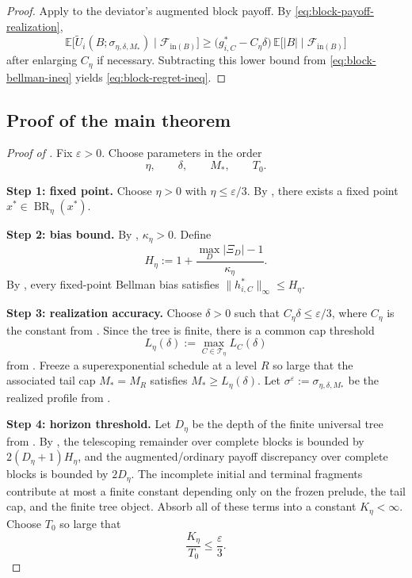 \documentclass[12pt]{article}
\theoremstyle{definition}
\newcommand{\eps}{\varepsilon}
\newcommand{\E}{\mathbb{E}}
\newcommand{\1}{\mathbf{1}}
\newcommand{\cF}{\mathcal{F}}
\newcommand{\cT}{\mathcal{T}}
\DeclareMathOperator{\BR}{BR}
\begin{document}
\begin{proof}
Apply  to the deviator's augmented block payoff. By
\eqref{eq:block-payoff-realization},
\[
\E\bigl[\widetilde U_i(B;\sigma_{\eta,\delta,M_*})\mid\cF_{\mathrm{in}(B)}\bigr]
\ge
\bigl(g_{i,C}^*-C_\eta\delta\bigr)\,
\E\bigl[|B|\mid\cF_{\mathrm{in}(B)}\bigr]
\]
after enlarging $C_\eta$ if necessary. Subtracting this lower bound from
\eqref{eq:block-bellman-ineq} yields \eqref{eq:block-regret-ineq}.
\end{proof}

\subsection{Proof of the main theorem}



\begin{proof}[Proof of ]
Fix $\eps>0$. Choose parameters in the order
\[
\eta,\qquad \delta,\qquad M_*,\qquad T_0.
\]

\smallskip
\noindent\textbf{Step 1: fixed point.}
Choose $\eta>0$ with $\eta\le \eps/3$. By
, there exists a fixed point $x^*\in\BR_\eta(x^*)$.

\smallskip
\noindent\textbf{Step 2: bias bound.}
By , $\kappa_\eta>0$. Define
\[
H_\eta:=1+\frac{\max_D|\Xi_D|-1}{\kappa_\eta}.
\]
By , every fixed-point Bellman bias satisfies
$\|h_{i,C}^*\|_\infty\le H_\eta$.

\smallskip
\noindent\textbf{Step 3: realization accuracy.}
Choose $\delta>0$ such that $C_\eta\delta\le \eps/3$, where $C_\eta$ is the
constant from . Since the tree is finite, there is a common
cap threshold
\[
L_\eta(\delta):=\max_{C\in\cT_\eta}L_C(\delta)
\]
from . Freeze a superexponential schedule at a level
$R$ so large that the associated tail cap $M_*=M_R$ satisfies
$M_*\ge L_\eta(\delta)$. Let
$\sigma^\eps:=\sigma_{\eta,\delta,M_*}$ be the realized profile from
.

\smallskip
\noindent\textbf{Step 4: horizon threshold.}
Let $D_\eta$ be the depth of the finite universal tree from
. By , the telescoping remainder
over complete blocks is bounded by $2(D_\eta+1)H_\eta$, and the augmented/ordinary
payoff discrepancy over complete blocks is bounded by $2D_\eta$. The incomplete
initial and terminal fragments contribute at most a finite constant depending only
on the frozen prelude, the tail cap, and the finite tree object. Absorb all of
these terms into a constant $K_\eta<\infty$. Choose $T_0$ so large that
\[
\frac{K_\eta}{T_0}\le \frac{\eps}{3}.
\]


\end{proof}
\end{document}
